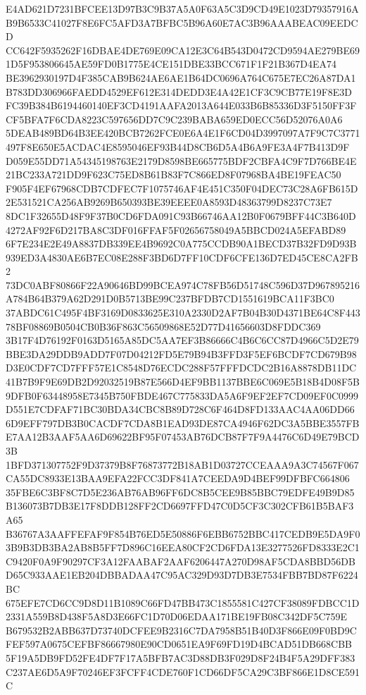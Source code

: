 \documentclass[UTF8,fontset=fandol,zihao=-4,a4paper]{ctexart}
\begin{document}
{{E4AD621D7231BFCEE13D97B3C9B37A5A0F63A5C3D9CD49E1023D79357916AB9B6533C41027F8E6FC5AFD3A7BFBC5B96A60E7AC3B96AAABEAC09EEDCD
CC642F5935262F16DBAE4DE769E09CA12E3C64B543D0472CD9594AE279BE691D5F953806645AE59FD0B1775E4CE151DBE33BCC671F1F21B367D4EA74
BE3962930197D4F385CAB9B624AE6AE1B64DC0696A764C675E7EC26A87DA1B783DD306966FAEDD4529EF612E314DEDD3E4A42E1CF3C9CB77E19F8E3D
FC39B384B6194460140EF3CD4191AAFA2013A644E033B6B85336D3F5150FF3FCF5BFA7F6CDA8223C597656DD7C9C239BABA659ED0ECC56D52076A0A6
5DEAB489BD64B3EE420BCB7262FCE0E6A4E1F6CD04D3997097A7F9C7C3771497F8E650E5ACDAC4E8595046EF93B44D8CB6D5A4B6A9FE3A4F7B413D9F
D059E55DD71A54345198763E2179D8598BE665775BDF2CBFA4C9F7D766BE4E21BC233A721DD9F623C75ED8B61B83F7C866ED8F07968BA4BE19FEAC50
F905F4EF67968CDB7CDFEC7F1075746AF4E451C350F04DEC73C28A6FB615D2E531521CA256AB9269B650393BE39EEEE0A8593D48363799D8237C73E7
8DC1F32655D48F9F37B0CD6FDA091C93B66746AA12B0F0679BFF44C3B640D4272AF92F6D217BA8C3DF016FFAF5F02656758049A5BBCD024A5EFABD89
6F7E234E2E49A8837DB339EE4B9692C0A775CCDB90A1BECD37B32FD9D93B939ED3A4830AE6B7EC08E288F3BD6D7FF10CDF6CFE136D7ED45CE8CA2FB2
73DC0ABF80866F22A90646BD99BCEA974C78FB56D51748C596D37D967895216A784B64B379A62D291D0B5713BE99C237BFDB7CD1551619BCA11F3BC0
37ABDC61C495F4BF3169D0833625E310A2330D2AF7B04B30D4371BE64C8F44378BF08869B0504CB0B36F863C56509868E52D77D41656603D8FDDC369
3B17F4D76192F0163D5165A85DC5AA7EF3B86666C4B6C6CC87D4966C5D2E79BBE3DA29DDB9ADD7F07D04212FD5E79B94B3FFD3F5EF6BCDF7CD679B98
D3E0CDF7CD7FFF57E1C8548D76ECDC288F57FFFDCDC2B16A8878DB11DC41B7B9F9E69DB2D92032519B87E566D4EF9BB1137BBE6C069E5B18B4D08F5B
9DFB0F63448958E7345B750FBDE467C775833DA5A6F9EF2EF7CD09EF0C0999D551E7CDFAF71BC30BDA34CBC8B89D728C6F464D8FD133AAC4AA06DD66
6D9EFF797DB3B0CACDF7CDA8B1EAD93DE87CA4946F62DC3A5BBE3557FBE7AA12B3AAF5AA6D69622BF95F07453AB76DCB87F7F9A4476C6D49E79BCD3B
1BFD371307752F9D37379B8F76873772B18AB1D03727CCEAAA9A3C74567F067CA55DC8933E13BAA9EFA22FCC3DF841A7CEEDA9D4BEF99DFBFC664806
35FBE6C3BF8C7D5E236AB76AB96FF6DC8B5CEE9B85BBC79EDFE49B9D85B136073B7DB3E17F8DDB128FF2CD6697FFD47C0D5CF3C302CFB61B5BAF3A65
B36767A3AAFFEFAF9F854B76ED5E50886F6EBB6752BBC417CEDB9E5DA9F03B9B3DB3BA2AB8B5FF7D896C16EEA80CF2CD6FDA13E3277526FD8333E2C1
C9420F0A9F90297CF3A12FAABAF2AAF6206447A270D98AF5CDA8BBD56DBD65C933AAE1EB204DBBADAA47C95AC329D93D7DB3E7534FBB7BD87F6224BC
675EFE7CD6CC9D8D11B1089C66FD47BB473C1855581C427CF38089FDBCC1D2331A559B8D438F5A8D3E66FC1D70D06EDAA171BE19FB08C342DF5C759E
B679532B2ABB637D73740DCFEE9B2316C7DA7958B51B40D3F866E09F0BD9CFEF597A0675CEFBF86667980E90CD0651EA9F69FD19D4BCAD51DB668CBB
5F19A5DB9FD52FE4DF7F17A5BFB7AC3D88DB3F029D8F24B4F5A29DFF383C237AE6D5A9F70246EF3FCFF4CDE760F1CD66DF5CA29C3BF866E1D8CE591C
}}
\end{document}
